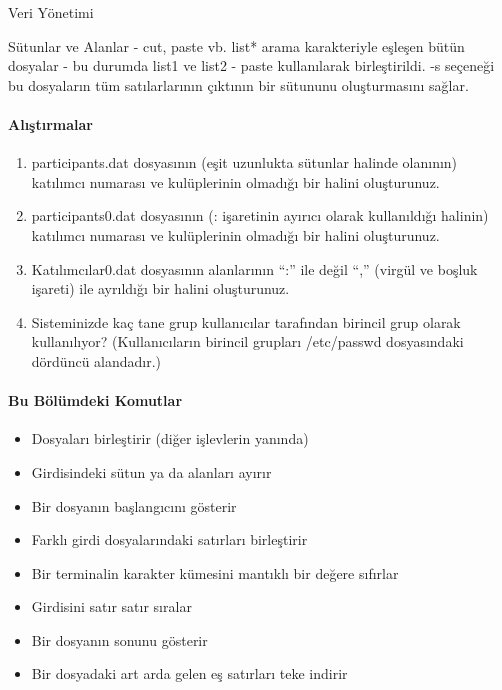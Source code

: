 \begin{section}{Veri Yönetimi}
\begin{subsection}{Sütunlar ve Alanlar - cut, paste vb.}
list* arama karakteriyle eşleşen bütün dosyalar - bu durumda list1 ve list2 - paste kullanılarak birleştirildi. -s seçeneği bu dosyaların tüm satılarlarının çıktının bir sütununu oluşturmasını sağlar.

\paragraph{{\Huge{\PencilLeftDown}}Alıştırmalar}{
\begin{enumerate}
 \item participants.dat dosyasının (eşit uzunlukta sütunlar halinde olanının) katılımcı numarası ve kulüplerinin olmadığı bir halini oluşturunuz.
 \item participants0.dat dosyasının (: işaretinin ayırıcı olarak kullanıldığı halinin) katılımcı numarası ve kulüplerinin olmadığı bir halini oluşturunuz.
 \item Katılımcılar0.dat dosyasının alanlarının “:” ile değil “,\textvisiblespace ” (virgül ve boşluk işareti) ile ayrıldığı bir halini oluşturunuz.
 \item Sisteminizde kaç tane grup kullanıcılar tarafından birincil grup olarak kullanılıyor? (Kullanıcıların birincil grupları /etc/passwd dosyasındaki dördüncü alandadır.)
\end{enumerate}}

\paragraph{Bu Bölümdeki Komutlar}{
\begin{itemize}
\item[cat]Dosyaları birleştirir (diğer işlevlerin yanında)
\item[cut]Girdisindeki sütun ya da alanları ayırır
\item[head]Bir dosyanın başlangıcını gösterir
\item[paste]Farklı girdi dosyalarındaki satırları birleştirir
\item[reset]Bir terminalin karakter kümesini mantıklı bir değere sıfırlar
\item[sort]Girdisini satır satır sıralar
\item[tail]Bir dosyanın sonunu gösterir
\item[uniq]Bir dosyadaki art arda gelen eş satırları teke indirir
\end{itemize}}


\end{subsection}
\end{section}
